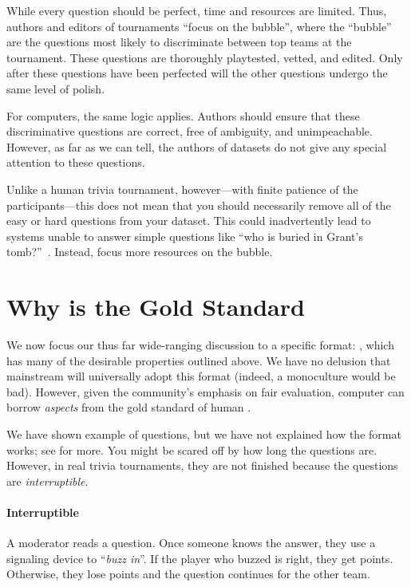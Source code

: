 While every question should be perfect, time and resources are limited.  
Thus, authors and editors of tournaments ``focus on the bubble'', where the ``bubble'' are the questions most likely to discriminate between top teams at the tournament.
These questions are thoroughly playtested, vetted, and edited.
Only after these questions have been perfected will the other questions undergo the same level of polish.

For computers, the same logic applies.  
Authors should ensure that these discriminative questions are correct, free of ambiguity, and unimpeachable.
However, as far as we can tell, the authors of \qa{} datasets do not give any special attention to these questions.

Unlike a human trivia tournament, however---with finite patience of the participants---this does not mean that you should necessarily remove all of the easy or hard questions from your dataset.
This could inadvertently lead to systems unable to answer simple questions like ``who is buried in Grant's tomb?''~\cite[Chapter 7]{dwan-00}.
Instead, focus more resources on the bubble.



\section{Why \qb{} is the Gold Standard}
\label{sec:qb}

We now focus our thus far wide-ranging  discussion to a specific format: \qb{}, which has many of the desirable properties outlined above.
We have no delusion that mainstream  will universally adopt this format (indeed, a monoculture would be bad).
However, given the community's emphasis on fair evaluation, computer  can borrow \emph{aspects} from the gold standard of human .

We have shown example of \qb{} questions, but we have not explained how the format works; see \citet{DBLP:journals/corr/abs-1904-04792} for more.
You might be scared off by how long the questions are.
However, in real \qb{} trivia tournaments, they are not finished because the questions are \emph{interruptible}.

\paragraph{Interruptible}

A moderator reads a question.
Once someone knows the answer, they use a signaling device to ``\emph{buzz in}''.
If the player who buzzed is right, they get points.
Otherwise, they lose points and the question continues for the other team.  

